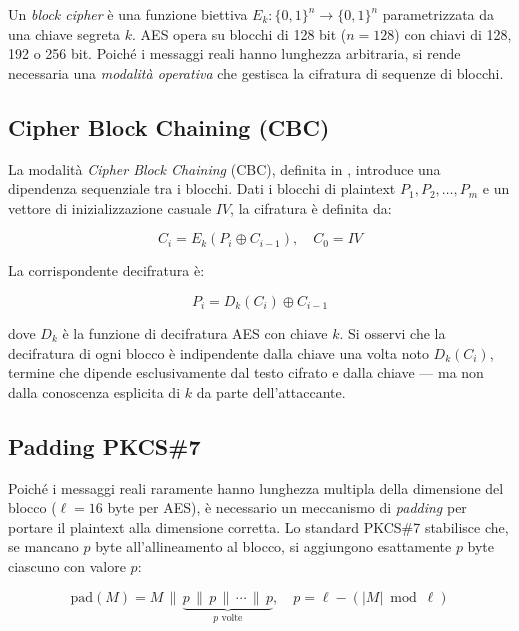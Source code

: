 \documentclass[12pt,a4paper]{article}
\begin{document}
Un \emph{block cipher} è una funzione biettiva $E_k : \{0,1\}^n \to \{0,1\}^n$ parametrizzata
da una chiave segreta $k$. AES opera su blocchi di 128 bit ($n = 128$) con chiavi di 128, 192
o 256 bit. Poiché i messaggi reali hanno lunghezza arbitraria, si rende necessaria una
\emph{modalità operativa} che gestisca la cifratura di sequenze di blocchi.

\subsection{Cipher Block Chaining (CBC)}

La modalità \emph{Cipher Block Chaining} (CBC), definita in \cite{nist-sp800-38a}, introduce
una dipendenza sequenziale tra i blocchi. Dati i blocchi di plaintext
$P_1, P_2, \ldots, P_m$ e un vettore di inizializzazione casuale $IV$, la cifratura è definita da:

\begin{equation}
  C_i = E_k\!\left(P_i \oplus C_{i-1}\right), \quad C_0 = IV
\end{equation}

La corrispondente decifratura è:

\begin{equation}
  P_i = D_k(C_i) \oplus C_{i-1}
\end{equation}

dove $D_k$ è la funzione di decifratura AES con chiave $k$. Si osservi che la decifratura
di ogni blocco è indipendente dalla chiave una volta noto $D_k(C_i)$, termine che dipende
esclusivamente dal testo cifrato e dalla chiave — ma non dalla conoscenza esplicita di $k$
da parte dell'attaccante.

\subsection{Padding PKCS\#7}

Poiché i messaggi reali raramente hanno lunghezza multipla della dimensione del blocco
($\ell = 16$ byte per AES), è necessario un meccanismo di \emph{padding} per portare
il plaintext alla dimensione corretta. Lo standard PKCS\#7 \cite{pkcs7} stabilisce che,
se mancano $p$ byte all'allineamento al blocco, si aggiungono esattamente $p$ byte ciascuno
con valore $p$:

\begin{equation}
  \text{pad}(M) = M \,\|\, \underbrace{p \,\|\, p \,\|\, \cdots \,\|\, p}_{p \text{ volte}},
  \quad p = \ell - (|M| \bmod \ell)
\end{equation}
\end{document}
